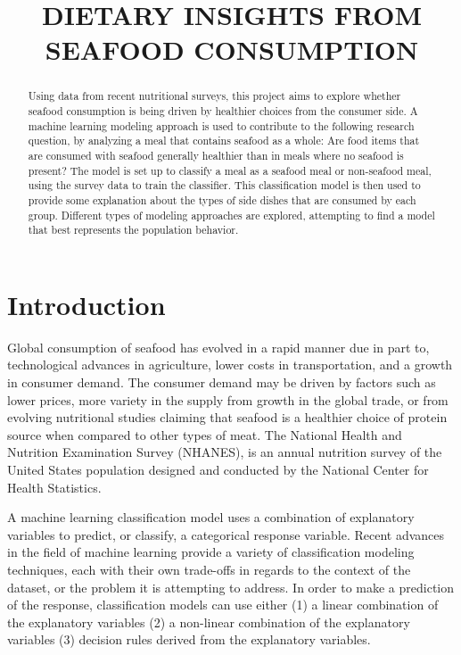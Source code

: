 \documentclass{article}
\title{DIETARY INSIGHTS FROM SEAFOOD CONSUMPTION}
\begin{document}
%
\maketitle
%
\begin{abstract}
Using data from recent nutritional surveys, this project aims to explore whether seafood consumption is being driven by healthier choices from the consumer side. A machine learning modeling approach is used to contribute to the following research question, by analyzing a meal that contains seafood as a whole: Are food items that are consumed with seafood generally healthier than in meals where no seafood is present? The model is set up to classify a meal as a seafood meal or non-seafood meal, using the survey data to train the classifier. This classification model is then used to provide some explanation about the types of side dishes that are consumed by each group. Different types of modeling approaches are explored, attempting to find a model that best represents the population behavior.
\end{abstract}

\section{Introduction}
\label{sec:intro}

Global consumption of seafood has evolved in a rapid manner due in part to, technological advances in agriculture, lower costs in transportation, and a growth in consumer demand. The consumer demand may be driven by factors such as lower prices, more variety in the supply from growth in the global trade, or from evolving nutritional studies claiming that seafood is a healthier choice of protein source when compared to other types of meat. The National Health and Nutrition Examination Survey (NHANES), is an annual nutrition survey of the United States population designed and conducted by the National Center for Health Statistics. 

A machine learning classification model uses a combination of explanatory variables to predict, or classify, a categorical response variable. Recent advances in the field of machine learning provide a variety of classification modeling techniques, each with their own trade-offs in regards to the context of the dataset, or the problem it is attempting to address. In order to make a prediction of the response, classification models can use either (1) a linear combination of the explanatory variables (2) a non-linear combination of the explanatory variables (3) decision rules derived from the explanatory variables. 
\end{document}

